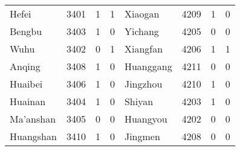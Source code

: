 \documentclass[12pt]{article}
\begin{document}
\begin{table}[!htb]
\begin{adjustbox}{width=\textwidth, totalheight=\baselineskip,keepaspectratio}
\begin{tabular}{llrlllrl}
       Hefei &  3401 &    1 &   1 &       Xiaogan &  4209 &    1 &   0 \\
      Bengbu &  3403 &    1 &   0 &       Yichang &  4205 &    0 &   0 \\
        Wuhu &  3402 &    0 &   1 &      Xiangfan &  4206 &    1 &   1 \\
      Anqing &  3408 &    1 &   0 &     Huanggang &  4211 &    0 &   0 \\
     Huaibei &  3406 &    1 &   0 &      Jingzhou &  4210 &    1 &   0 \\
     Huainan &  3404 &    1 &   0 &        Shiyan &  4203 &    1 &   0 \\
   Ma'anshan &  3405 &    0 &   0 &      Huangyou &  4202 &    0 &   0 \\
   Huangshan &  3410 &    1 &   0 &       Jingmen &  4208 &    0 &   0 
\end{tabular}
\end{adjustbox}
\end{table}
\end{document}
